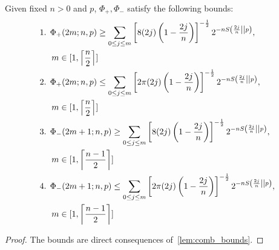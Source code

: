 \documentclass[pra,
aps,
twocolumn,
superscriptaddress,
groupedaddress,
nofootinbib,
reprint
]{revtex4-1}
\begin{document}
\begin{lemma}\label{lem:phi_strictbounds}
	Given fixed $n>0$ and $p$, $\Phi_+, \Phi_-$ satisfy the following bounds:
	\begin{align*}
		\begin{split}
		&\text{1. } \Phi_+(2m; n, p) \geq \sum_{0\leq j \leq m}\left[ 8(2j)\left(1-\frac{2j}{n}\right) \right]^{-\frac{1}{2}} 2^{-nS\left( \frac{2j}{n} \middle\vert\middle\vert p \right)}, \\
		&\hspace{14pt} m\in [1,\left\lceil\frac{n}{2}\right\rceil] \\
		&\text{2. } \Phi_+(2m; n, p) \leq \sum_{0\leq j \leq m}\left[ 2\pi(2j)\left(1-\frac{2j}{n}\right) \right]^{-\frac{1}{2}} 2^{-nS\left( \frac{2j}{n} \middle\vert\middle\vert p \right)}, \\
		&\hspace{14pt} m\in [1,\left\lceil\frac{n}{2}\right\rceil] \\
		&\text{3. } \Phi_-(2m+1; n, p) \geq \sum_{0\leq j \leq m}\left[ 8(2j)\left(1-\frac{2j}{n}\right) \right]^{-\frac{1}{2}} 2^{-nS\left( \frac{2j}{n} \middle\vert\middle\vert p \right)}, \\
		&\hspace{14pt} m\in [1,\left\lceil\frac{n-1}{2}\right\rceil] \\
		&\text{4. } \Phi_-(2m+1; n, p) \leq \sum_{0\leq j \leq m}\left[ 2\pi(2j)\left(1-\frac{2j}{n}\right) \right]^{-\frac{1}{2}} 2^{-nS\left( \frac{2j}{n} \middle\vert\middle\vert p \right)}, \\
		&\hspace{14pt} m\in [1,\left\lceil\frac{n-1}{2}\right\rceil] \\
		\end{split}
	\end{align*}
\end{lemma}
\begin{proof}
	The bounds are direct consequences of~\cref{lem:comb_bounds}.
\end{proof}
\end{document}
